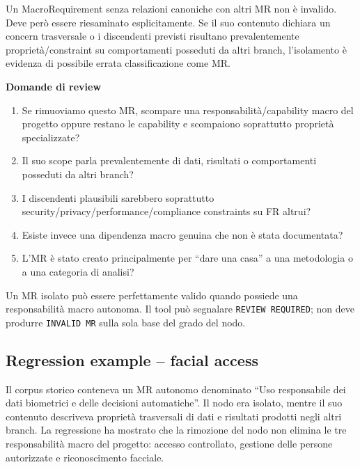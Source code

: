 \documentclass[11pt,a4paper]{article}
\begin{document}
\begin{candidatebox}
Un MacroRequirement senza relazioni canoniche con altri MR non è invalido. Deve però essere riesaminato esplicitamente. Se il suo contenuto dichiara un concern trasversale o i discendenti previsti risultano prevalentemente proprietà/constraint su comportamenti posseduti da altri branch, l'isolamento è evidenza di possibile errata classificazione come MR.
\end{candidatebox}

\textbf{Domande di review}
\begin{enumerate}
\item Se rimuoviamo questo MR, scompare una responsabilità/capability macro del progetto oppure restano le capability e scompaiono soprattutto proprietà specializzate?
\item Il suo scope parla prevalentemente di dati, risultati o comportamenti posseduti da altri branch?
\item I discendenti plausibili sarebbero soprattutto security/privacy/performance/compliance constraints su FR altrui?
\item Esiste invece una dipendenza macro genuina che non è stata documentata?
\item L'MR è stato creato principalmente per ``dare una casa'' a una metodologia o a una categoria di analisi?
\end{enumerate}

\begin{warningbox}
Un MR isolato può essere perfettamente valido quando possiede una responsabilità macro autonoma. Il tool può segnalare \texttt{REVIEW REQUIRED}; non deve produrre \texttt{INVALID MR} sulla sola base del grado del nodo.
\end{warningbox}

\subsection{Regression example -- facial access}
Il corpus storico conteneva un MR autonomo denominato ``Uso responsabile dei dati biometrici e delle decisioni automatiche''. Il nodo era isolato, mentre il suo contenuto descriveva proprietà trasversali di dati e risultati prodotti negli altri branch. La regressione ha mostrato che la rimozione del nodo non elimina le tre responsabilità macro del progetto: accesso controllato, gestione delle persone autorizzate e riconoscimento facciale.
\end{document}
